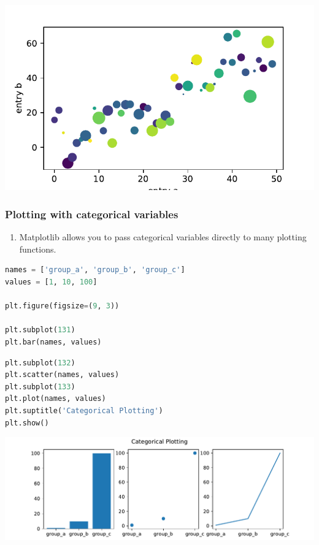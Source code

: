 \documentclass[UTF8,a4paper,12pt]{ctexart}  %
\providecommand{\tightlist}{\setlength{\itemsep}{0pt}\setlength{\parskip}{0pt}}
\begin{document}
\begin{center}\includegraphics[width=0.9\linewidth]{python-visualization_files/figure-latex/unnamed-chunk-9-1} \end{center}

\hypertarget{plotting-with-categorical-variables}{%
\subsubsection{Plotting with categorical variables}\label{plotting-with-categorical-variables}}

\begin{enumerate}
\def\labelenumi{\arabic{enumi}.}
\tightlist
\item
  Matplotlib allows you to pass categorical variables directly to many
  plotting functions.
\end{enumerate}

\begin{lstlisting}[language=Python]
names = ['group_a', 'group_b', 'group_c']
values = [1, 10, 100]

plt.figure(figsize=(9, 3))

plt.subplot(131)
plt.bar(names, values)
\end{lstlisting}

\begin{lstlisting}[language=Python]
plt.subplot(132)
plt.scatter(names, values)
plt.subplot(133)
plt.plot(names, values)
plt.suptitle('Categorical Plotting')
plt.show()
\end{lstlisting}

\begin{center}\includegraphics[width=0.9\linewidth]{python-visualization_files/figure-latex/unnamed-chunk-10-1} \end{center}
\end{document}
